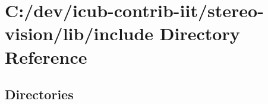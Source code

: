 \section{C\+:/dev/icub-\/contrib-\/iit/stereo-\/vision/lib/include Directory Reference}
\label{dir_5a30104352ef4255dc24354b02eb2d20}
\subsection*{Directories}
\begin{DoxyCompactItemize}
\end{DoxyCompactItemize}
